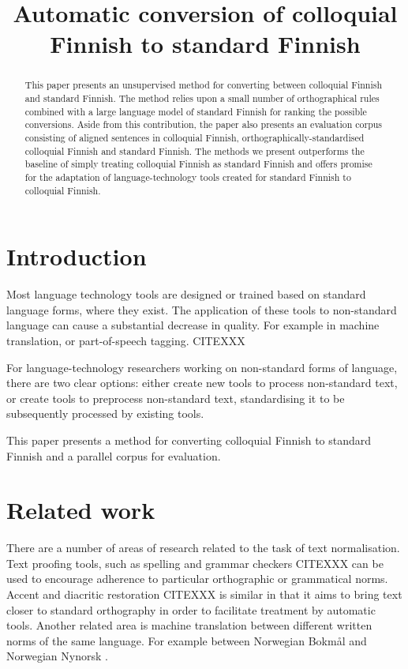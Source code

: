 \documentclass[11pt]{article}
\title{Automatic conversion of colloquial Finnish to standard Finnish}
\author{}
\date{}
\begin{document}
\maketitle
\begin{abstract}
  This paper presents an unsupervised method for converting between colloquial Finnish
  and standard Finnish. The method relies upon a small number of orthographical rules
  combined with a large language model of standard Finnish for ranking the possible 
  conversions. Aside from this contribution, the paper also presents an evaluation
  corpus consisting of aligned sentences in colloquial Finnish, orthographically-standardised
  colloquial Finnish and standard Finnish. The methods we present outperforms the baseline
  of simply treating colloquial Finnish as standard Finnish and offers promise for the adaptation
  of language-technology tools created for standard Finnish to colloquial Finnish.
\end{abstract}

\section{Introduction}

Most language technology tools are designed or trained based on standard language 
forms, where they exist. The application of these tools to non-standard
language can cause a substantial decrease in quality. For example in machine translation,
or part-of-speech tagging. CITEXXX

For language-technology researchers working on non-standard forms of language, there are 
two clear options: either create new tools to process non-standard text,
  or create tools to preprocess non-standard text, standardising it to be subsequently processed
 by existing tools.

This paper presents a method for converting colloquial Finnish to standard Finnish and 
a parallel corpus for evaluation.

\section{Related work}

There are a number of areas of research related to the task of text normalisation. Text
proofing tools, such as spelling and grammar checkers CITEXXX can be used to encourage adherence
to particular orthographic or grammatical norms. Accent and diacritic restoration CITEXXX is similar
in that it aims to bring text closer to standard orthography in order to facilitate treatment by 
automatic tools. Another related area is machine translation between different written norms of 
the same language. For example between Norwegian Bokm\aa{}l and Norwegian Nynorsk \cite{unhammer2009}.
\end{document}
